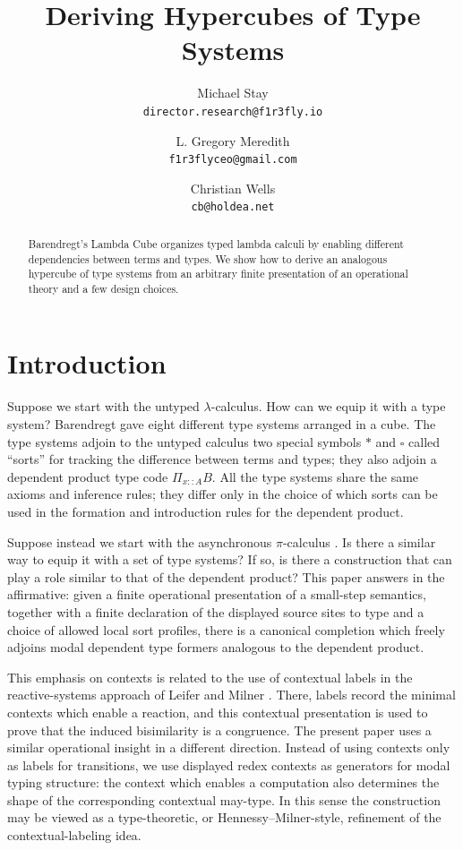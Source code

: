 \documentclass[11pt]{article}
\title{Deriving Hypercubes of Type Systems}
\author{Michael Stay\\\texttt{director.research@f1r3fly.io}
  \and L. Gregory Meredith\\\texttt{f1r3flyceo@gmail.com}
  \and Christian Wells\\\texttt{cb@holdea.net}}
\date{}
\begin{document}
\maketitle

\begin{abstract}
Barendregt’s Lambda Cube organizes typed lambda calculi by enabling different dependencies between terms and types. We show how to derive an analogous hypercube of type systems from an arbitrary finite presentation of an operational theory and a few design choices.
\end{abstract}

\section{Introduction}
\label{sec:introduction}

Suppose we start with the untyped $\lambda$-calculus.  How can we equip it with a type system?  Barendregt \cite{Barendregt1991} gave eight different type systems arranged in a cube.  The type systems adjoin to the untyped calculus two special symbols $*$ and $\square$ called ``sorts'' for tracking the difference between terms and types; they also adjoin a dependent product type code $\Pi_{x::A} B.$  All the type systems share the same axioms and inference rules; they differ only in the choice of which sorts can be used in the formation and introduction rules for the dependent product.

Suppose instead we start with the asynchronous $\pi$-calculus \cite{MilnerParrowWalker1992, HondaTokoro1991, Boudol1992}.  Is there a similar way to equip it with a set of type systems?  If so, is there a construction that can play a role similar to that of the dependent product? This paper answers in the affirmative: given a finite operational presentation of a small-step semantics, together with a finite declaration of the displayed source sites to type and a choice of allowed local sort profiles, there is a canonical completion which freely adjoins modal dependent type formers analogous to the dependent product.

This emphasis on contexts is related to the use of contextual labels in the reactive-systems approach of Leifer and Milner \cite{LeiferMilner2000}.  There, labels record the minimal contexts which enable a reaction, and this contextual presentation is used to prove that the induced bisimilarity is a congruence.  The present paper uses a similar operational insight in a different direction.  Instead of using contexts only as labels for transitions, we use displayed redex contexts as generators for modal typing structure: the context which enables a computation also determines the shape of the corresponding contextual may-type.  In this sense the construction may be viewed as a type-theoretic, or Hennessy--Milner-style, refinement of the contextual-labeling idea.
\end{document}

